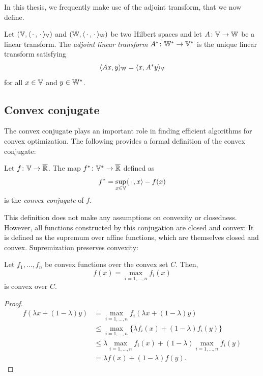 In this thesis, we frequently make use of the adjoint transform, that we now define.
\begin{definition}%
	\label{def:adjoint transform}
	Let \( (\mathbb{V}, \langle \,\cdot\,, \,\cdot\, \rangle_{\mathbb{V}} ) \) and \( (\mathbb{W}, \langle \,\cdot\,, \,\cdot\, \rangle_{\mathbb{W}} ) \) be two Hilbert spaces and let \( A \colon \mathbb{V} \to \mathbb{W} \) be a linear transform.
	The \emph{adjoint linear transform} \( A^{\ast} \colon \mathbb{W}^{\ast} \to \mathbb{V}^{\ast} \) is the unique linear transform satisfying
	\[
		\langle Ax, y \rangle_{\mathbb{W}} = \langle x, A^{\ast}y \rangle_{\mathbb{V}}
	\]
	for all \( x \in \mathbb{V} \) and \( y \in \mathbb{W}^{\ast} \).
\end{definition}
\subsection{Convex conjugate}
The convex conjugate plays an important role in finding efficient algorithms for convex optimization.
The following provides a formal definition of the convex conjugate:
\begin{definition}%
	\label{def:convex conjugate}
	Let \( f \colon \mathbb{V} \to \overline{\mathbb{R}} \).
	The map \( f^{\ast} \colon \mathbb{V}^{\ast} \to \overline{\mathbb{R}} \) defined as
	\[
		f^{\ast} = \sup_{x \in \mathbb{V}} \langle \,\cdot\,, x \rangle - f(x)
	\]
	is the \emph{convex conjugate} of \( f \).
\end{definition}
This definition does not make any assumptions on convexity or closedness.
However, all functions constructed by this conjugation are closed and convex:
It is defined as the supremum over affine functions, which are themselves closed and convex.
Supremization preserves convexity:
\begin{theorem}
		Let  \( f_{\num{1}}, \ldots, f_n \) be convex functions over the convex set \( C \).
		Then,
		\[
			f(x)=\max_{i=\num{1},\ldots,n}f_i(x)
		\]
		is convex over \( C \).
\end{theorem}
\begin{proof}
	\begin{align*}
		f(\lambda x+(1-\lambda)y)&=\max_{i=1,\ldots,n}f_i(\lambda x+(1-\lambda)y)\\
		&\leq\max_{i=1,\ldots,n}\{\lambda f_i(x)+(1-\lambda)f_i(y)\}\\
		&\leq\lambda\max_{i=1,\ldots,n}f_i(x)+(1-\lambda)\max_{i=1,\ldots,n}f_i(y)\\
		&=\lambda f(x)+(1-\lambda)f(y).
	\end{align*}
\end{proof}
